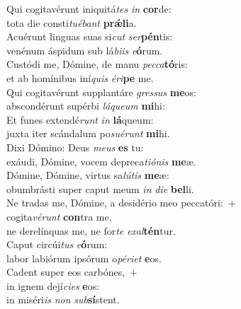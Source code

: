\evenverse Qui cogitavérunt iniquitá\textit{tes} \textit{in} \textbf{cor}de:~\*\\
\evenverse tota die consti\textit{tu}\textit{é}\textit{bant} \textbf{prǽ}\textbf{li}a.\\
\oddverse Acuérunt linguas suas si\textit{cut} \textit{ser}\textbf{pén}tis:~\*\\
\oddverse venénum áspidum sub lá\textit{bi}\textit{is} \textit{e}\textbf{ó}rum.\\
\evenverse Custódi me, Dómine, de manu \textit{pec}\textit{ca}\textbf{tó}ris:~\*\\
\evenverse et ab homínibus iní\textit{quis} \textit{é}\textit{ri}\textbf{pe} me.\\
\oddverse Qui cogitavérunt supplantáre \textit{gres}\textit{sus} \textbf{me}os:~\*\\
\oddverse abscondérunt supérbi \textit{lá}\textit{que}\textit{um} \textbf{mi}hi:\\
\evenverse Et funes extendé\textit{runt} \textit{in} \textbf{lá}queum:~\*\\
\evenverse juxta iter scándalum po\textit{su}\textit{é}\textit{runt} \textbf{mi}hi.\\
\oddverse Dixi Dómino: Deus \textit{me}\textit{us} \textbf{es} tu:~\*\\
\oddverse exáudi, Dómine, vocem depreca\textit{ti}\textit{ó}\textit{nis} \textbf{me}æ.\\
\evenverse Dómine, Dómine, virtus sa\textit{lú}\textit{tis} \textbf{me}æ:~\*\\
\evenverse obumbrásti super caput meum \textit{in} \textit{di}\textit{e} \textbf{bel}li.\\
\oddverse Ne tradas me, Dómine, a desidério meo peccatóri:~+\\
\oddverse  cogita\textit{vé}\textit{runt} \textbf{con}tra me,~\*\\
\oddverse ne derelínquas me, ne for\textit{te} \textit{e}\textit{xal}\textbf{tén}tur.\\
\evenverse Caput circúi\textit{tus} \textit{e}\textbf{ó}rum:~\*\\
\evenverse labor labiórum ipsórum o\textit{pé}\textit{ri}\textit{et} \textbf{e}os.\\
\oddverse Cadent super eos carbónes,~+\\
\oddverse  in ignem dejí\textit{ci}\textit{es} \textbf{e}os:~\*\\
\oddverse in miséri\textit{is} \textit{non} \textit{sub}\textbf{sí}stent.\\
